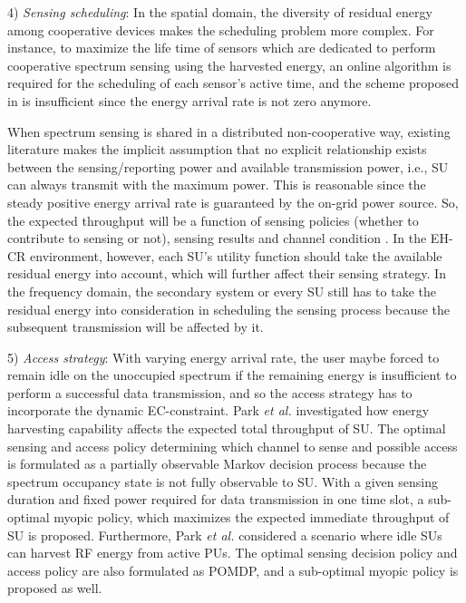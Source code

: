 \documentclass[journal,12pt,onecolumn]{IEEEtran}
\begin{document}
4) \emph{Sensing scheduling}: In the spatial domain, the diversity of residual energy among cooperative devices makes the scheduling problem more complex. For instance, to maximize the life time of sensors which are dedicated to perform cooperative spectrum sensing using the harvested energy, an online algorithm is required for the scheduling of each sensor's active time, and the scheme proposed in \cite{eeSSc2} is insufficient since the energy arrival rate is not zero anymore.

When spectrum sensing is shared in a distributed non-cooperative way, existing literature makes the implicit assumption that no explicit relationship exists between the sensing/reporting power and available transmission power, i.e., SU can always transmit with the maximum power. This is reasonable since the steady positive energy arrival rate is guaranteed by the on-grid power source. So, the expected throughput will be a function of sensing policies (whether to contribute to sensing or not), sensing results and channel condition . In the EH-CR environment, however, each SU's utility function should take the available residual energy into account, which will further affect their sensing strategy. In the frequency domain, the secondary system or every SU still has to take the residual energy into consideration in scheduling the sensing process because the subsequent transmission will be affected by it.


5) \emph{Access strategy}: With varying energy arrival rate, the user maybe forced to remain idle on the unoccupied spectrum if the remaining energy is insufficient to perform a successful data transmission, and so the access strategy has to incorporate the dynamic EC-constraint. Park \emph{et al.} \cite{overlayEHCRbourBernoulli} investigated how energy harvesting capability affects the expected total throughput of SU. The optimal sensing and access policy determining which channel to sense and possible access is formulated as a partially observable Markov decision process because the spectrum occupancy state is not fully observable to SU. With a given sensing duration and fixed power required for data transmission in one time slot, a sub-optimal myopic policy, which maximizes the expected immediate throughput of SU is proposed. Furthermore, Park \emph{et al.} \cite{EHrfCRsensingHarvesting} considered a scenario where idle SUs can harvest RF energy from active PUs. The optimal sensing decision policy and access policy are also formulated as POMDP, and a sub-optimal myopic policy is proposed as well.
\end{document}
